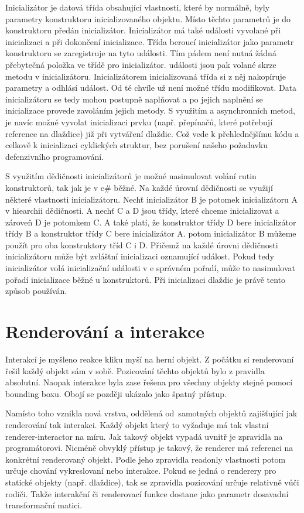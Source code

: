 Inicializátor je datová třída obsahující vlastnosti, které by normálně, byly parametry konstruktoru inicializovaného objektu.
Místo těchto parametrů je do konstruktoru předán inicializátor. Inicializátor má také události vyvolané
při inicializaci a při dokončení inicializace. Třída beroucí inicializátor jako parametr konstruktoru se zaregistruje na tyto události.
Tím pádem není nutná žádná přebytečná položka ve třídě pro inicializátor. události jsou pak volané skrze metodu v inicializátoru.
Inicializátorem inicializovaná třída si z něj nakopíruje parametry a odhlásí událost. Od té chvíle už není možné třídu modifikovat.
Data inicializátoru se tedy mohou postupně naplňovat a po jejich naplnění se inicializace provede zavoláním jejich metody.
S využitím a asynchronních metod, je navíc možné vyvolat inicializaci prvku (např. přepínačů, které potřebují reference na dlaždice) 
již při vytváření dlaždic. Což vede k přehlednějšímu kódu a celkově k inicializaci cyklických struktur, bez porušení našeho
požadavku defenzivního programování.

S využitím dědičnosti inicializátorů je možné nasimulovat volání rutin konstruktorů, tak jak je v c\#  běžné. Na každé úrovní dědičnosti
se využijí některé vlastnosti inicializátoru. Nechť inicializátor B
je potomek inicializátoru A v hiearchii dědičnosti. A nechť C a D jsou třídy, které chceme inicializovat a zároveň D je potomkem C.
A také platí, že konstruktor třídy D bere inicializátor třídy B a konstruktor třídy C bere inicializátor A. potom inicializátor B můžeme
použít pro oba konstruktory tříd C i D. Přičemž na každé úrovni dědičnosti inicializátoru může být zvláštní inicializaci oznamující událost.
Pokud tedy inicializátor volá inicializační události v e správném pořadí, může to nasimulovat pořadí inicializace běžné u konstruktorů.
Při inicializaci dlaždic je právě tento způsob používán.

\section{Renderování a interakce}
Interakcí je myšleno reakce kliku myší na herní objekt. Z počátku si renderovaní řešil každý objekt sám v sobě. Pozicování
těchto objektů bylo z pravidla absolutní. Naopak interakce byla zase řešena pro všechny objekty stejně pomocí bounding boxu.
Obojí se později ukázalo jako špatný přístup. 

Namísto toho vznikla nová vrstva, oddělená od~samotných objektů zajišťující jak renderování tak interakci. Každý objekt
který to vyžaduje má tak vlastní renderer-interactor na míru. Jak takový objekt vypadá uvnitř je zpravidla na programátorovi. 
Nicméně obvyklý přístup je takový, že renderer má referenci na konkrétní renderovaný objekt. Podle jeho zpravidla readonly vlastnosti potom určuje
chování vykreslovaní nebo interakce. Pokud se jedná o renderery pro statické objekty (např. dlaždice), tak se zpravidla pozicování určuje relativně
vůči rodiči. Takže interakční či renderovací funkce dostane jako parametr dosavadní transformační matici.

